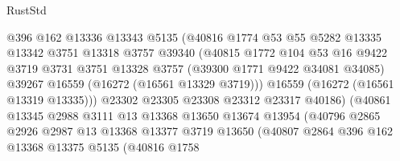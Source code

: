 \begin{lexlean}{RustStd}
\begin{coremodule}
                              @396
                              @162
                              @13336
                              @13343
                              @5135
                              (@40816
                                @1774
                                @53
                                @55
                                @5282
                                @13335
                                @13342
                                @3751
                                @13318
                                @3757
                                @39340
                                (@40815
                                  @1772
                                  @104
                                  @53
                                  @16
                                  @9422
                                  @3719
                                  @3731
                                  @3751
                                  @13328
                                  @3757
                                  (@39300 @1771 @9422 @34081 @34085)
                                  @39267
                                  @16559
                                  (@16272 (@16561 @13329 @3719)))
                                @16559
                                (@16272 (@16561 @13319 @13335)))
                              @23302
                              @23305
                              @23308
                              @23312
                              @23317
                              @40186)
                            (@40861
                              @13345
                              @2988
                              @3111
                              @13
                              @13368
                              @13650
                              @13674
                              @13954
                              (@40796
                                @2865
                                @2926
                                @2987
                                @13
                                @13368
                                @13377
                                @3719
                                @13650
                                (@40807
                                  @2864
                                  @396
                                  @162
                                  @13368
                                  @13375
                                  @5135
                                  (@40816
                                    @1758

\end{coremodule}
\end{lexlean}
